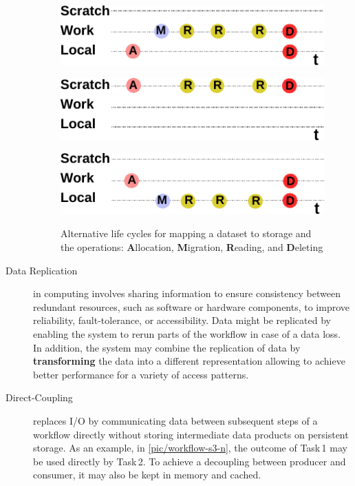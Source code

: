 \documentclass{superfri}
\begin{document}
\begin{description}
\begin{figure}[b]
    \begin{minipage}{.33\linewidth}
        \centering
        \includegraphics[width=0.9\columnwidth]{pic/lifecycle-1}
        \label{fig:lifecycle1}
    \end{minipage}
    \begin{minipage}{.33\linewidth}
        \centering
        \includegraphics[width=0.9\columnwidth]{pic/lifecycle-2}
        \label{fig:lifecycle2}
    \end{minipage}
    \begin{minipage}{.33\linewidth}
        \centering
        \includegraphics[width=0.9\columnwidth]{pic/lifecycle-3}
        \label{fig:lifecycle3}
    \end{minipage}
    \vspace{5pt}
    \caption{Alternative life cycles for mapping a dataset to storage and the operations: \textbf{A}llocation, \textbf{M}igration, \textbf{R}eading, and \textbf{D}eleting}
    \label{fig:lifecycle}
\end{figure}

\item[Data Replication] in computing involves sharing information to ensure consistency between redundant resources, such as software or hardware components, to improve reliability, fault-tolerance, or accessibility.
Data might be replicated by enabling the system to rerun parts of the workflow in case of a data loss.
In addition, the system may combine the replication of data by \textbf{transforming} the data into a different representation allowing to achieve better performance for a variety of access patterns.

\item[Direct-Coupling] replaces I/O by communicating data between subsequent steps of a workflow directly without storing intermediate data products on persistent storage.
As an example, in \cref{pic/workflow-s3-n}, the outcome of Task\,1 may be used directly by Task\,2.
To achieve a decoupling between producer and consumer, it may also be kept in memory and cached.
\end{description}
\end{document}
